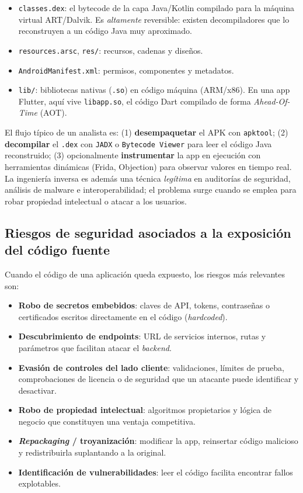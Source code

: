 \documentclass[12pt,letterpaper]{article}
\begin{document}
\begin{itemize}[leftmargin=1.4em]
  \item \texttt{classes.dex}: el bytecode de la capa Java/Kotlin compilado para
        la máquina virtual ART/Dalvik. Es \emph{altamente} reversible: existen
        decompiladores que lo reconstruyen a un código Java muy aproximado.
  \item \texttt{resources.arsc}, \texttt{res/}: recursos, cadenas y diseños.
  \item \texttt{AndroidManifest.xml}: permisos, componentes y metadatos.
  \item \texttt{lib/}: bibliotecas nativas (\texttt{.so}) en código máquina
        (ARM/x86). En una app Flutter, aquí vive \texttt{libapp.so}, el código
        Dart compilado de forma \emph{Ahead-Of-Time} (AOT).
\end{itemize}

El flujo típico de un analista es: (1) \textbf{desempaquetar} el APK con
\texttt{apktool}; (2) \textbf{decompilar} el \texttt{.dex} con \texttt{JADX} o
\texttt{Bytecode Viewer} para leer el código Java reconstruido; (3) opcionalmente
\textbf{instrumentar} la app en ejecución con herramientas dinámicas (Frida,
Objection) para observar valores en tiempo real. La ingeniería inversa es además
una técnica \emph{legítima} en auditorías de seguridad, análisis de malware e
interoperabilidad; el problema surge cuando se emplea para robar propiedad
intelectual o atacar a los usuarios.

\subsection{Riesgos de seguridad asociados a la exposición del código fuente}

Cuando el código de una aplicación queda expuesto, los riesgos más relevantes
son:

\begin{itemize}[leftmargin=1.4em]
  \item \textbf{Robo de secretos embebidos}: claves de API, tokens, contraseñas
        o certificados escritos directamente en el código (\emph{hardcoded}).
  \item \textbf{Descubrimiento de endpoints}: URL de servicios internos, rutas y
        parámetros que facilitan atacar el \emph{backend}.
  \item \textbf{Evasión de controles del lado cliente}: validaciones, límites de
        prueba, comprobaciones de licencia o de seguridad que un atacante puede
        identificar y desactivar.
  \item \textbf{Robo de propiedad intelectual}: algoritmos propietarios y lógica
        de negocio que constituyen una ventaja competitiva.
  \item \textbf{\emph{Repackaging} / troyanización}: modificar la app, reinsertar
        código malicioso y redistribuirla suplantando a la original.
  \item \textbf{Identificación de vulnerabilidades}: leer el código facilita
        encontrar fallos explotables.
\end{itemize}
\end{document}
